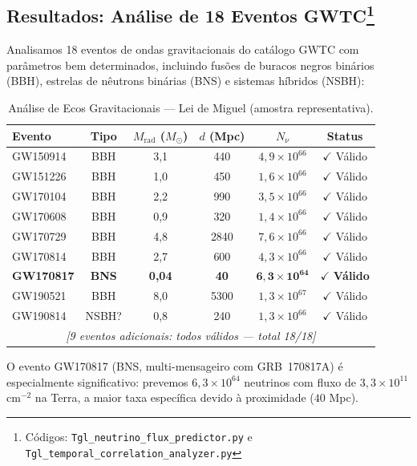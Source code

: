 \documentclass[12pt,a4paper,twoside]{article}
\begin{document}
\subsection[Resultados: An\'alise de 18 Eventos GWTC]{Resultados: An\'alise de 18 Eventos GWTC\footnote{C\'odigos: \texttt{Tgl\_neutrino\_flux\_predictor.py} e \texttt{Tgl\_temporal\_correlation\_analyzer.py}}}

Analisamos 18 eventos de ondas gravitacionais do cat\'alogo GWTC com par\^ametros bem determinados, incluindo fus\~oes de buracos negros bin\'arios (BBH), estrelas de n\^eutrons bin\'arias (BNS) e sistemas h\'ibridos (NSBH):

\begin{table}[H]
\centering
\caption{An\'alise de Ecos Gravitacionais --- Lei de Miguel (amostra representativa).}
\label{tab:echoes}
\small
\begin{tabular}{lccccc}
\toprule
\textbf{Evento} & \textbf{Tipo} & $M_{\text{rad}}$ ($M_\odot$) & $d$ (Mpc) & $N_\nu$ & \textbf{Status} \\
\midrule
GW150914 & BBH & 3{,}1 & 440 & $4{,}9 \times 10^{66}$ & $\checkmark$ V\'alido \\
GW151226 & BBH & 1{,}0 & 450 & $1{,}6 \times 10^{66}$ & $\checkmark$ V\'alido \\
GW170104 & BBH & 2{,}2 & 990 & $3{,}5 \times 10^{66}$ & $\checkmark$ V\'alido \\
GW170608 & BBH & 0{,}9 & 320 & $1{,}4 \times 10^{66}$ & $\checkmark$ V\'alido \\
GW170729 & BBH & 4{,}8 & 2840 & $7{,}6 \times 10^{66}$ & $\checkmark$ V\'alido \\
GW170814 & BBH & 2{,}7 & 600 & $4{,}3 \times 10^{66}$ & $\checkmark$ V\'alido \\
\textbf{GW170817} & \textbf{BNS} & \textbf{0{,}04} & \textbf{40} & $\mathbf{6{,}3 \times 10^{64}}$ & $\checkmark$ \textbf{V\'alido} \\
GW190521 & BBH & 8{,}0 & 5300 & $1{,}3 \times 10^{67}$ & $\checkmark$ V\'alido \\
GW190814 & NSBH? & 0{,}8 & 240 & $1{,}3 \times 10^{66}$ & $\checkmark$ V\'alido \\
\multicolumn{6}{c}{\textit{[9 eventos adicionais: todos v\'alidos --- total 18/18]}} \\
\bottomrule
\end{tabular}
\end{table}

\noindent O evento GW170817 (BNS, multi-mensageiro com GRB~170817A) \'e especialmente significativo: prevemos $6{,}3 \times 10^{64}$ neutrinos com fluxo de $3{,}3 \times 10^{11}$ cm$^{-2}$ na Terra, a maior taxa espec\'ifica devido \`a proximidade ($40$ Mpc).
\end{document}
